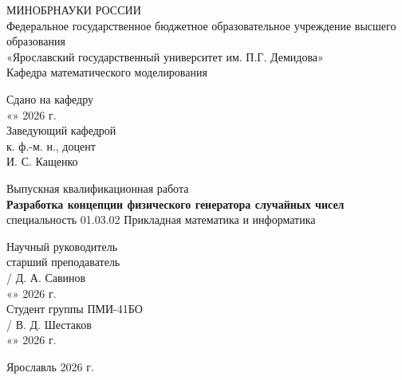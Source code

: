 \documentclass[14pt,a4paper]{extarticle}
\begin{document}
\begin{titlepage}
\thispagestyle{empty}
\begin{center}
МИНОБРНАУКИ РОССИИ\\
Федеральное государственное бюджетное образовательное учреждение высшего образования\\
«Ярославский государственный университет им. П.Г. Демидова»\\
Кафедра математического моделирования
\end{center}

\vspace{0.8cm}
\begin{flushright}
Сдано на кафедру\\
«\underline{\hspace{1cm}}» \underline{\hspace{3cm}} 2026 г.\\
Заведующий кафедрой\\
к. ф.-м. н., доцент\\
\underline{\hspace{4cm}} И. С. Кащенко
\end{flushright}

\vspace{1.2cm}
\begin{center}
{Выпускная квалификационная работа}\\[0.5cm]
{\bfseries Разработка концепции физического генератора случайных чисел}\\[0.5cm]
специальность 01.03.02 Прикладная математика и информатика
\end{center}

\vspace{1cm}
\begin{flushright}
Научный руководитель\\
старший преподаватель\\
\underline{\hspace{3cm}} / Д. А. Савинов\\
«\underline{\hspace{1cm}}» \underline{\hspace{3cm}} 2026 г.\\[0.7cm]
Студент группы ПМИ-41БО\\
\underline{\hspace{3cm}} / В. Д. Шестаков\\
«\underline{\hspace{1cm}}» \underline{\hspace{3cm}} 2026 г.
\end{flushright}

\vfill
\begin{center}
Ярославль 2026 г.
\end{center}
\end{titlepage}

\tableofcontents
\newpage
\end{document}
